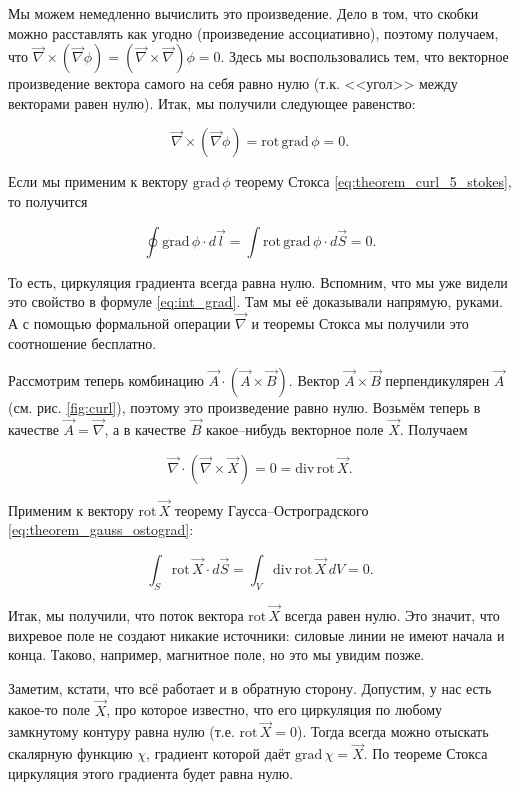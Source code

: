 \documentclass[11pt,a4paper]{article}
\numberwithin{equation}{section}
\newcommand{\grad}{\mathrm{grad}\,}
\newcommand{\rot}{\mathrm{rot}\,}
\renewcommand{\div}{\mathrm{div}\,}
\newcommand{\vn}{\vec{\nabla}}
\begin{document}
Мы можем немедленно вычислить это произведение. Дело в том, что скобки
можно расставлять как угодно (произведение ассоциативно), поэтому
получаем, что $\vn \times (\vn \phi) = (\vn \times \vn) \phi
=0$. Здесь мы воспользовались тем, что векторное произведение вектора
самого на себя равно нулю (т.к. <<угол>> между векторами равен
нулю). Итак, мы получили следующее равенство: 

\begin{equation}
  \label{eq:rot_grad}
  \vn \times (\vn \phi) = \rot \grad \phi = 0.
\end{equation}

Если мы применим к вектору $\grad \phi$ теорему Стокса
\eqref{eq:theorem_curl_5_stokes}, то получится

\begin{equation}
  \label{eq:stokes_gradient}
  \oint \grad \phi \cdot d\vec{l} = \int \rot \grad \phi \cdot
  d\vec{S} = 0.
\end{equation}

То есть, циркуляция градиента всегда равна нулю. Вспомним, что мы уже
видели это свойство в формуле \eqref{eq:int_grad}. Там мы её
доказывали напрямую, руками. А с помощью формальной операции $\vn$ и
теоремы Стокса мы получили это соотношение бесплатно.

Рассмотрим теперь комбинацию $ \vec{A} \cdot (\vec{A} \times
\vec{B})$. Вектор $\vec{A} \times \vec{B}$ перпендикулярен $\vec{A}$
(см. рис. \ref{fig:curl}), поэтому это произведение равно
нулю. Возьмём теперь в качестве $\vec{A} = \vn$, а в качестве
$\vec{B}$ какое--нибудь векторное поле $\vec{X}$. Получаем

\begin{equation}
  \label{eq:div_rot}
  \vn \cdot (\vn \times \vec{X}) = 0 = \div \rot \vec{X}.
\end{equation}

Применим к вектору $\rot \vec{X}$ теорему Гаусса--Остроградского
\eqref{eq:theorem_gauss_ostograd}:

\begin{equation}
  \label{eq:gauss_rot}
  \int_S \rot \vec{X} \cdot d\vec{S} = \int_V \div \rot \vec{X}\, dV = 0.
\end{equation}

Итак, мы получили, что поток вектора $\rot \vec{X}$ всегда равен
нулю. Это значит, что вихревое поле не создают никакие источники:
силовые линии не имеют начала и конца. Таково, например, магнитное
поле, но это мы увидим позже.

Заметим, кстати, что всё работает и в обратную сторону. Допустим, у
нас есть какое-то поле $\vec{X}$, про которое известно, что его
циркуляция по любому замкнутому контуру равна нулю (т.е. $\rot \vec{X}
=0$). Тогда всегда можно отыскать скалярную функцию $\chi$, градиент
которой даёт $\grad \chi = \vec{X}$. По теореме Стокса циркуляция
этого градиента будет равна нулю. 
\end{document}
